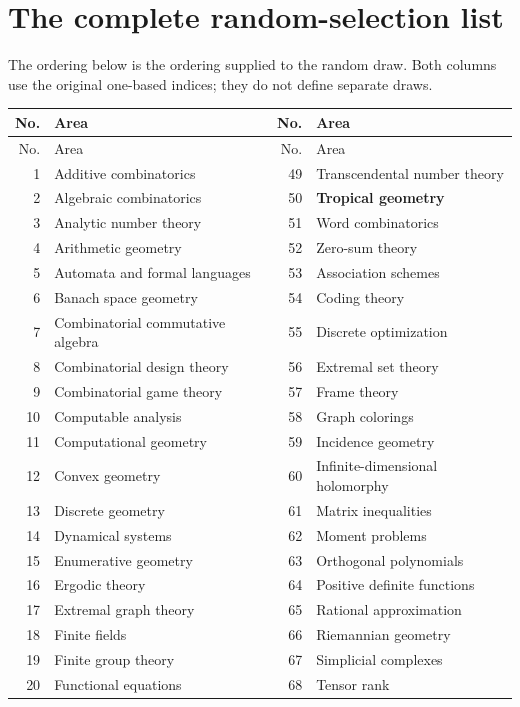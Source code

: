 \documentclass[11pt,a4paper]{article}
\numberwithin{equation}{section}
\theoremstyle{definition}
\theoremstyle{remark}
\begin{document}
\section{The complete random-selection list}
\label{app:areas}

The ordering below is the ordering supplied to the random draw. Both columns
use the original one-based indices; they do not define separate draws.

\small
\begin{longtable}{@{}r p{6.55cm} r p{6.55cm}@{}}
\toprule
No.&Area&No.&Area\\
\midrule
\endfirsthead
\toprule
No.&Area&No.&Area\\
\midrule
\endhead
1 & Additive combinatorics & 49 & Transcendental number theory \\
2 & Algebraic combinatorics & 50 & \textbf{Tropical geometry} \\
3 & Analytic number theory & 51 & Word combinatorics \\
4 & Arithmetic geometry & 52 & Zero-sum theory \\
5 & Automata and formal languages & 53 & Association schemes \\
6 & Banach space geometry & 54 & Coding theory \\
7 & Combinatorial commutative algebra & 55 & Discrete optimization \\
8 & Combinatorial design theory & 56 & Extremal set theory \\
9 & Combinatorial game theory & 57 & Frame theory \\
10 & Computable analysis & 58 & Graph colorings \\
11 & Computational geometry & 59 & Incidence geometry \\
12 & Convex geometry & 60 & Infinite-dimensional holomorphy \\
13 & Discrete geometry & 61 & Matrix inequalities \\
14 & Dynamical systems & 62 & Moment problems \\
15 & Enumerative geometry & 63 & Orthogonal polynomials \\
16 & Ergodic theory & 64 & Positive definite functions \\
17 & Extremal graph theory & 65 & Rational approximation \\
18 & Finite fields & 66 & Riemannian geometry \\
19 & Finite group theory & 67 & Simplicial complexes \\
20 & Functional equations & 68 & Tensor rank \\

\end{longtable}
\end{document}
